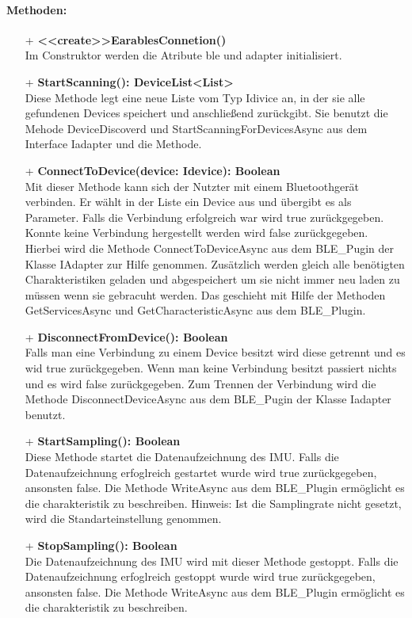 \documentclass[a4paper,12pt]{article}
\begin{document}
\paragraph{Methoden:}
\begin{itemize}
	\item[+] \textbf{<<create>>EarablesConnetion()}\\ Im Construktor werden die Atribute ble und adapter initialisiert.
	\item[+] \textbf{StartScanning(): DeviceList<List>}\\ Diese Methode legt eine neue Liste vom Typ Idivice an, in der sie alle gefundenen Devices speichert und anschließend zurückgibt. Sie benutzt die Mehode DeviceDiscoverd und StartScanningForDevicesAsync aus dem Interface Iadapter und die Methode.
	\item[+] \textbf{ConnectToDevice(device: Idevice): Boolean}\\ Mit dieser Methode kann sich der Nutzter mit einem Bluetoothgerät verbinden. Er wählt in der Liste  ein Device aus und übergibt es als Parameter. Falls die Verbindung erfolgreich war wird true zurückgegeben. Konnte keine Verbindung hergestellt werden wird false zurückgegeben. Hierbei wird die Methode ConnectToDeviceAsync aus dem BLE\_Pugin der Klasse IAdapter zur Hilfe genommen. Zusätzlich werden gleich alle benötigten Charakteristiken geladen und abgespeichert um sie nicht immer neu laden zu müssen wenn sie gebracuht werden. Das geschieht mit Hilfe der Methoden GetServicesAsync und GetCharacteristicAsync aus dem BLE\_Plugin.
	\item[+] \textbf{DisconnectFromDevice(): Boolean}\\ Falls man eine Verbindung zu einem Device besitzt wird diese getrennt und es wid true zurückgegeben. Wenn man keine Verbindung besitzt passiert nichts und es wird false zurückgegeben. Zum Trennen der Verbindung wird die Methode DisconnectDeviceAsync aus dem BLE\_Pugin der Klasse Iadapter benutzt.
	\item[+] \textbf{StartSampling(): Boolean}\\ Diese Methode startet die Datenaufzeichnung des IMU. Falls die Datenaufzeichnung erfoglreich gestartet wurde wird true zurückgegeben, ansonsten false. Die Methode WriteAsync aus dem BLE\_Plugin ermöglicht es die charakteristik zu beschreiben. Hinweis: Ist die Samplingrate nicht gesetzt, wird die Standarteinstellung genommen.
	\item[+] \textbf{StopSampling(): Boolean}\\Die Datenaufzeichnung des IMU wird mit dieser Methode gestoppt. Falls die Datenaufzeichnung erfoglreich gestoppt wurde wird true zurückgegeben, ansonsten false. Die Methode WriteAsync aus dem BLE\_Plugin ermöglicht es die charakteristik zu beschreiben.

\end{itemize}
\end{document}
